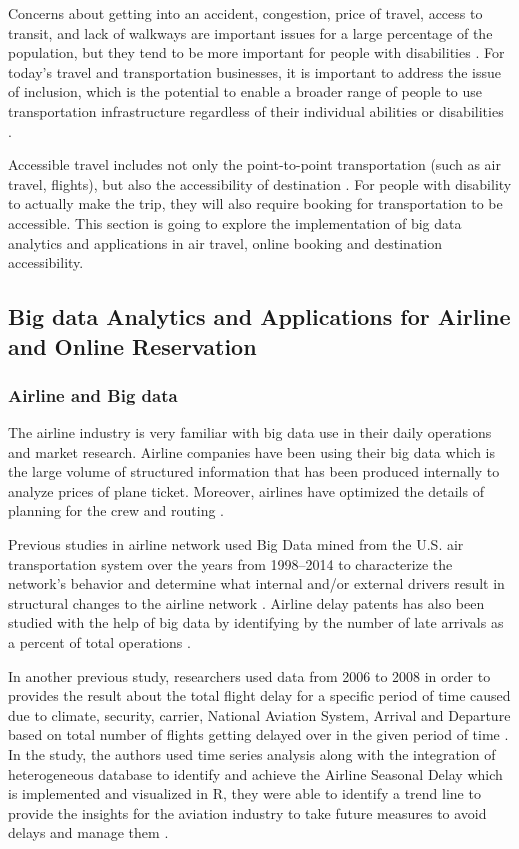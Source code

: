 Concerns about getting into an accident, congestion,
price of travel, access to transit, and lack of walkways are important issues for a large
percentage of the population, but they tend to be more important for people with
disabilities \cite{moya2016dynamic}. For today's travel and transportation businesses,
it is important to address the issue of inclusion, which is the potential to enable 
a broader range of people to use
transportation infrastructure regardless of their individual abilities or disabilities
\cite{milo}. 

Accessible travel includes not only the point-to-point transportation (such as air
travel, flights), but also the accessibility of destination \cite{Ama,DARCY2010816,milo}.
For people with disability to actually make the trip, they will also require booking for
transportation to be accessible. This section is going to explore the implementation of big
data analytics and applications in air travel, online booking and destination
accessibility. 

\subsection{Big data Analytics and Applications for Airline and Online Reservation}

\subsubsection{Airline and Big data}

The airline industry is very familiar with big data use in their daily operations and market research. Airline companies have been using their big data which is the large volume of structured information that has been produced internally \cite{MIAH2017} to analyze prices of plane ticket. Moreover, airlines have optimized the details of planning for the crew and routing \cite{Shafiee16}. 

Previous studies in airline network used Big Data mined from the U.S. air transportation system over the years from 1998–2014 to characterize the network's behavior and determine what internal and/or external drivers result in structural changes to the airline network \cite{7777957}. Airline delay patents has also been studied with the help of big data by identifying by the number of late arrivals as a percent of total operations \cite{Sor}. 

In another previous study, researchers used data from 2006 to 2008 in order to provides the result about the total flight delay for a specific period of time caused due to climate, security, carrier, National Aviation System, Arrival and Departure based on total number of flights getting delayed over in the given period of time \cite{Sor}. In the study, the authors used time series analysis along with the integration of heterogeneous database to identify and achieve the Airline Seasonal Delay which is implemented and visualized in R, they were able to identify a trend line to provide the insights for the aviation industry to take future measures to avoid delays and manage them \cite{Sor}.

